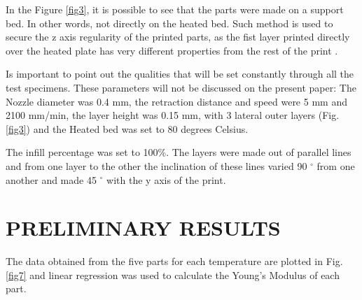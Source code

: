 \documentclass[10pt,fleqn,a4paper,twoside]{article}
\begin{document}
In the Figure \ref{fig3}, it is possible to see that the parts were made on a support bed. In other words, not directly on the heated bed. Such method is used to secure the z axis regularity of the printed parts, as the fist layer printed directly over the heated plate has very different properties from the rest of the print \citep{PETG}. 

Is important to point out the qualities that will be set constantly through all the test specimens. These parameters will not be discussed on the present paper: The Nozzle diameter was 0.4 mm, the retraction distance and speed were 5 mm and 2100 mm/min, the layer height was 0.15 mm, with 3 lateral outer layers (Fig.\ref{fig3}) and the Heated bed was set to 80 degrees Celsius.

The infill percentage was set to 100\%. The layers were made out of parallel lines and from one layer to the other the inclination of these lines varied 90 $^\circ$ from one another and made 45 $^\circ$ with the y axis of the print.









%



\section{PRELIMINARY RESULTS}
The data obtained from the five parts for each temperature are plotted in Fig.\ref{fig7} and linear regression was used to calculate the Young's Modulus of each part.
\end{document}
